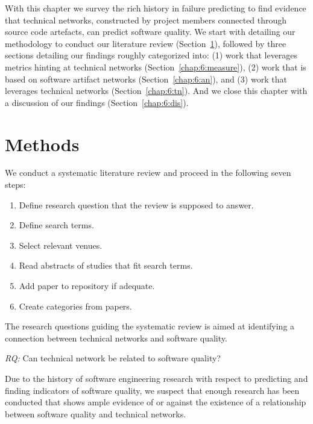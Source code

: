 \label{chap:tech-net}
With this chapter we survey the rich history in failure predicting to find evidence that technical networks, constructed by project members connected through source code artefacts, can predict software quality.
We start with detailing our methodology to conduct our literature review (Section~\ref{chap:6:methods}), followed by three sections detailing our findings roughly categorized into: 
(1) work that leverages metrics hinting at technical networks (Section~\ref{chap:6:measure}),
(2) work that is based on software artifact networks (Section~\ref{chap:6:an}),
and (3) work that leverages technical networks (Section~\ref{chap:6:tn}).
And we close this chapter with a discussion of our findings (Section~\ref{chap:6:dis}).

\section{Methods}
\label{chap:6:methods}
We conduct a systematic literature review and proceed in the following seven steps:

\begin{enumerate}
\item Define research question that the review is supposed to answer.
\item Define search terms.
\item Select relevant venues.
\item Read abstracts of studies that fit search terms.
\item Add paper to repository if adequate.
\item Create categories from papers.
\end{enumerate}

The research questions guiding the systematic review is aimed at identifying a connection between technical networks and software quality.

\begin{note}
\emph{RQ:} Can technical network be related to software quality? 
\end{note}

Due to the history of software engineering research with respect to predicting and finding indicators of software quality, we suspect that enough research has been conducted that shows ample evidence of or against the existence of a relationship between software quality and technical networks.

